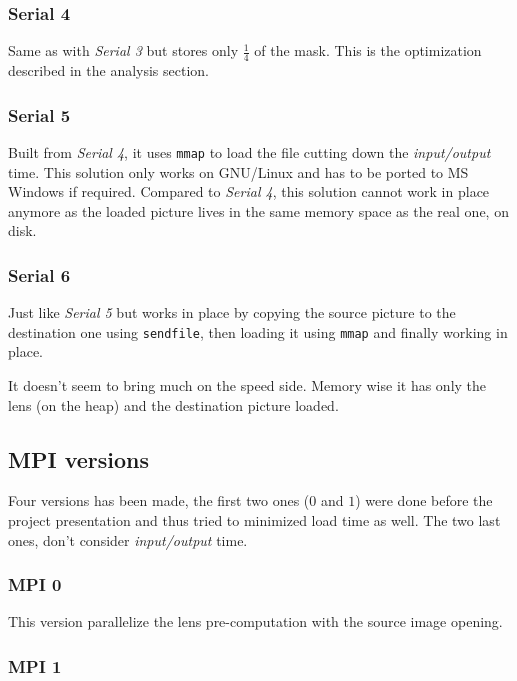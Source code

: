 \documentclass[10pt,a4paper]{article}
\begin{document}
\subsubsection{Serial 4}

Same as with \emph{Serial 3} but stores only $\frac{1}{4}$ of the mask. This is
the optimization described in the analysis section.

\subsubsection{Serial 5}

Built from \emph{Serial 4}, it uses \verb|mmap| to load the file cutting down
the \emph{input/output} time. This solution only works on GNU/Linux and has to
be ported to MS Windows if required. Compared to \emph{Serial 4}, this solution
cannot work in place anymore as the loaded picture lives in the same memory
space as the real one, on disk.

\subsubsection{Serial 6}

Just like \emph{Serial 5} but works in place by copying the source picture to
the destination one using \verb|sendfile|, then loading it using \verb|mmap|
and finally working in place.

It doesn't seem to bring much on the speed side. Memory wise it has only the
lens (on the heap) and the destination picture loaded.

\subsection{MPI versions}

Four versions has been made, the first two ones ($0$ and $1$) were done before
the project presentation and thus tried to minimized load time as well. The
two last ones, don't consider \emph{input/output} time.

\subsubsection{MPI 0}

This version parallelize the lens pre-computation with the source image opening.

\subsubsection{MPI 1}
\end{document}
